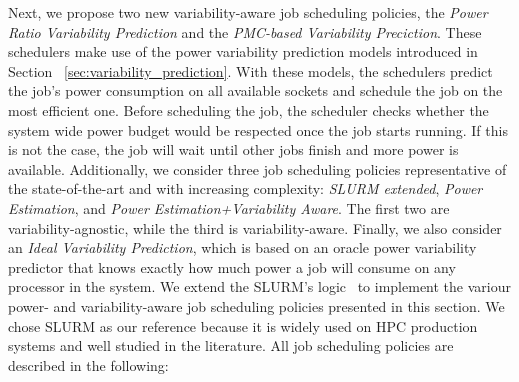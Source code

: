 
Next, we propose two new variability-aware job scheduling policies, the \textit{Power Ratio Variability Prediction} and the \textit{PMC-based Variability Preciction}. These schedulers make use of the power variability prediction models introduced in Section ~\ref{sec:variability_prediction}. With these models, the schedulers predict the job's power consumption on all available sockets and schedule the job on the most efficient one. Before scheduling the job, the scheduler checks whether the system wide power budget would be respected once the job starts running. If this is not the case, the job will wait until other jobs finish and more power is available.
Additionally, we consider three job scheduling policies representative of the state-of-the-art and with increasing complexity: \textit{SLURM extended}, \textit{Power Estimation}, and \textit{Power Estimation+Variability Aware}.  The first two are variability-agnostic, while the third is variability-aware.  
Finally, we also consider an \textit{Ideal Variability Prediction}, which is based on an oracle power variability predictor that knows exactly how much power a job will consume on any processor in the system. 
We extend the SLURM's logic~\cite{slurm_02} to implement the variour power- and variability-aware job scheduling policies presented in this section. We chose SLURM as our reference because it is widely used on HPC production systems and well studied in the literature.
All job scheduling policies are described in the following:

